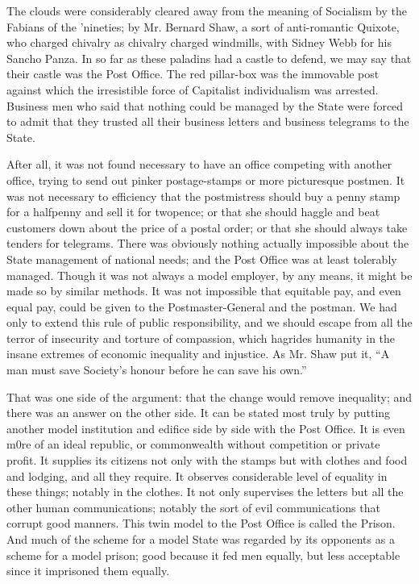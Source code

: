 \documentclass{book}
\begin{document}
The clouds were considerably cleared away from the meaning of Socialism by the Fabians of the ’nineties; by Mr. Bernard Shaw, a sort of anti-romantic Quixote, who charged chivalry as chivalry charged windmills, with Sidney Webb for his Sancho Panza. In so far as these paladins had a castle to defend, we may say that their castle was the Post Office. The red pillar-box was the immovable post against which the irresistible force of Capitalist individualism was arrested. Business men who said that nothing could be managed by the State were forced to admit that they trusted all their business letters and business telegrams to the State.

After all, it was not found necessary to have an office competing with another office, trying to send out pinker postage-stamps or more picturesque postmen. It was not necessary to efficiency that the postmistress should buy a penny stamp for a halfpenny and sell it for twopence; or that she should haggle and beat customers down about the price of a postal order; or that she should always take tenders for telegrams. There was obviously nothing actually impossible about the State management of national needs; and the Post Office was at least tolerably managed. Though it was not always a model employer, by any means, it might be made so by similar methods. It was not impossible that equitable pay, and even equal pay, could be given to the Postmaster-General and the postman. We had only to extend this rule of public responsibility, and we should escape from all the terror of insecurity and torture of compassion, which hagrides humanity in the insane extremes of economic inequality and injustice. As Mr. Shaw put it, “A man must save Society’s honour before he can save his own.”

That was one side of the argument: that the change would remove inequality; and there was an answer on the other side. It can be stated most truly by putting another model institution and edifice side by side with the Post Office. It is even m0re of an ideal republic, or commonwealth without competition or private profit. It supplies its citizens not only with the stamps but with clothes and food and lodging, and all they require. It observes considerable level of equality in these things; notably in the clothes. It not only supervises the letters but all the other human communications; notably the sort of evil communications that corrupt good manners. This twin model to the Post Office is called the Prison. And much of the scheme for a model State was regarded by its opponents as a scheme for a model prison; good because it fed men equally, but less acceptable since it imprisoned them equally.
\end{document}
